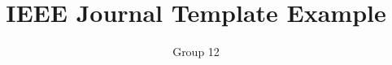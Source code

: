 \documentclass[journal]{IEEEtran}
\begin{document}
\title{IEEE Journal Template Example}


\author{Group 12}

\maketitle










\appendices






\end{document}
